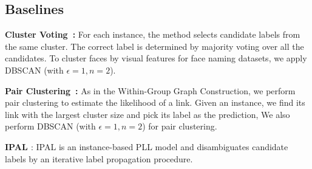 \documentclass[letterpaper]{article} \usepackage{aaai20}  \usepackage{times}  \usepackage{helvet} \usepackage{courier}  \usepackage[hyphens]{url}  \usepackage{graphicx} \urlstyle{rm} \def\UrlFont{\rm}  \frenchspacing  \setlength{\pdfpagewidth}{8.5in}  \setlength{\pdfpageheight}{11in}  \frenchspacing
\begin{document}
\begin{table*}
  \caption{Performance Comparison on MPII-MD and M-VAD}
  \label{sample-table}
  \centering
{}
 \end{table*}





\subsection{Baselines}

\noindent\textbf{Cluster Voting~\cite{sander1998density}:} 
For each instance, the method selects
candidate labels from the same cluster.  The correct label is determined by majority voting over all the candidates. To cluster faces by visual features for face naming datasets, we apply DBSCAN (with $\epsilon = 1, n=2$).


\noindent\textbf{Pair Clustering~\cite{sander1998density}:}
As in the Within-Group Graph Construction, we perform pair clustering to estimate the likelihood of a link. Given an instance, we find its link with the largest cluster size and pick its label as the prediction, We also perform DBSCAN (with $\epsilon = 1, n=2$) for pair clustering.


\noindent\textbf{IPAL \cite{zhang2015solving}}: IPAL is an instance-based PLL model and disambiguates candidate labels by an iterative label propagation procedure.
\end{document}
